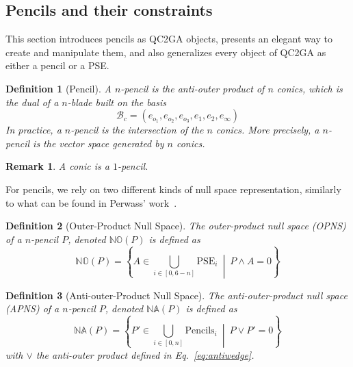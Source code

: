 \documentclass{birkjour}
\newtheorem{definition}{Definition}
\newtheorem{remark}{Remark}
\begin{document}
\subsection{Pencils and their constraints}
This section introduces pencils as QC2GA objects, presents an elegant way to create and manipulate them, and also generalizes every object of QC2GA as either a pencil or a PSE.

\begin{definition}[Pencil]
    A \(n\)-pencil is the anti-outer product of \(n\) conics, which is the dual of a \(n\)-blade built on the basis 
    \begin{equation}
        \mathcal{B}_c = \left(e_{o_1},e_{o_2},e_{o_3},e_1,e_2,e_\infty\right)   
    \end{equation}
    In practice, a \(n\)-pencil is the intersection of the \(n\) conics. More precisely, a $n$-pencil is the vector space generated by $n$ conics.
\end{definition}
\begin{remark}
    A conic is a \(1\)-pencil.
\end{remark}
\noindent For pencils, we rely on two different kinds of null space representation, similarly to what can be found in Perwass' work~\cite{perwass_geometric_2009}.
\begin{definition}[Outer-Product Null Space]
The outer-product null space (OPNS) of a \(n\)-pencil \(P\), denoted \(\mathbb{NO}\left(P\right)\) is defined as 
\begin{equation}
    \mathbb{NO}\left(P\right) = \left\{A \in \bigcup_{i\in[0,6-n]}\mathrm{PSE}_{i} ~\middle|~ P \wedge A = 0 \right\}
\end{equation}
\end{definition}

\begin{definition}[Anti-outer-Product Null Space]
The anti-outer-product null space (APNS) of a \(n\)-pencil \(P\), denoted \(\mathbb{NA}(P)\) is defined as 
\begin{equation}
    \mathbb{NA}\left(P\right) = \left\{P' \in \bigcup_{i\in[0,n]}\mathrm{Pencils}_{i} ~\middle|~ P \vee P' = 0 \right\}
\end{equation}
with \(\vee\) the anti-outer product defined in Eq.~\ref{eq:antiwedge}.
\end{definition}
\end{document}
